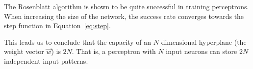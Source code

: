 The Rosenblatt algorithm is shown to be quite successful in training perceptrons.
When increasing the size of the network, the success rate converges towards the step function in Equation~\ref{eq:step}.

This leads us to conclude that the capacity of an \(N\)-dimensional hyperplane (the weight vector \(\vec{w}\)) is \(2N\).
That is, a perceptron with \(N\) input neurons can store \(2N\) independent input patterns.